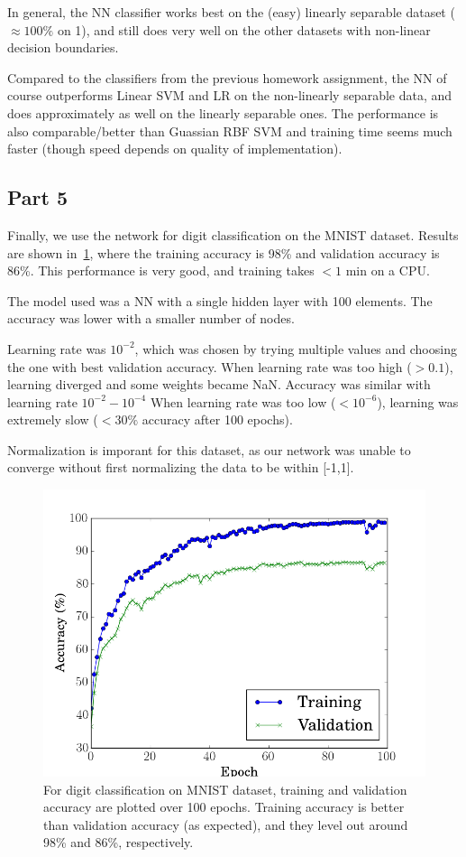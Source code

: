 In general, the NN classifier works best on the (easy) linearly separable dataset ($\approx 100\%$ on 1), and still does very well on the other datasets with non-linear decision boundaries.

Compared to the classifiers from the previous homework assignment, the NN of course outperforms Linear SVM and LR on the non-linearly separable data, and does approximately as well on the linearly separable ones. The performance is also comparable/better than Guassian RBF SVM and training time seems much faster (though speed depends on quality of implementation).




\subsection{Part 5}
Finally, we use the network for digit classification on the MNIST dataset.
Results are shown in~\cref{fig:1_5_acc}, where the training accuracy is 98\% and validation accuracy is 86\%.
This performance is very good, and training takes $<1$ min on a CPU.

The model used was a NN with a single hidden layer with 100 elements.
The accuracy was lower with a smaller number of nodes.

Learning rate was $10^{-2}$, which was chosen by trying multiple values and choosing the one with best validation accuracy.
When learning rate was too high ($>0.1$), learning diverged and some weights became NaN.
Accuracy was similar with learning rate $10^{-2} - 10^{-4}$
When learning rate was too low ($<10^{-6}$), learning was extremely slow ($<30\%$ accuracy after 100 epochs).

Normalization is imporant for this dataset, as our network was unable to converge without first normalizing the data to be within [-1,1].

\begin{figure}
	\centering
	\includegraphics [trim=0 0 0 0, clip, angle=0, width=0.8\columnwidth,
	keepaspectratio]{figures/1_5_acc}
	\caption{For digit classification on MNIST dataset, training and validation accuracy are plotted over 100 epochs. Training accuracy is better than validation accuracy (as expected), and they level out around 98\% and 86\%, respectively.} 
	\label{fig:1_5_acc} 
\end{figure}


